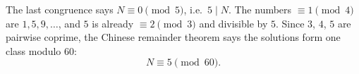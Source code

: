 The last congruence says $N\equiv0\pmod5$, i.e.\ $5\mid N$. The numbers $\equiv1\pmod4$ are $1,5,9,\dots$, and $5$ is already $\equiv2\pmod3$ and divisible by $5$. Since $3$, $4$, $5$ are pairwise coprime, the Chinese remainder theorem says the solutions form one class modulo $60$:
\[
\boxed{N\equiv5\pmod{60}}.
\]
